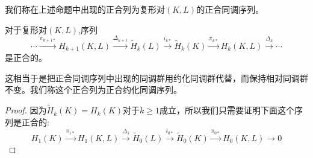  \begin{definition}
 我们称在上述命题中出现的正合列为复形对$(K,L)$的正合同调序列。
 \end{definition}
 
  


\begin{proposition}
对于复形对$(K,L)$,序列
 $$\cdots \xrightarrow{\pi_{k+1*}} H_{k+1}(K,L)\xrightarrow{\Delta_{k+1}}\tilde{H}_{k}(L)\xrightarrow{i_{k*}}\tilde{H}_{k}(K)\xrightarrow{\pi_{k*}}H_{k}(K,L)\xrightarrow{\Delta_{k}}\cdots$$是正合的。
\end{proposition}
\begin{remark}
这相当于是把正合同调序列中出现的同调群用约化同调群代替，而保持相对同调群不变。我们称这个正合列为正合约化同调序列。
\end{remark}
\begin{proof}
因为$\tilde{H}_{k}(K)=H_{k}(K)$对于$k\geq 1$成立，所以我们只需要证明下面这个序列是正合的:
\begin{equation*}
    H_{1}(K)\xrightarrow{\pi_{1*}}H_{1}(K,L)\xrightarrow{\Delta_{1}}\tilde{H}_{0}(L)\xrightarrow{i_{0*}}\tilde{H}_{0}(K)\xrightarrow{\pi_{0*}}H_{0}(K,L)\rightarrow 0
\end{equation*}


\end{proof}

